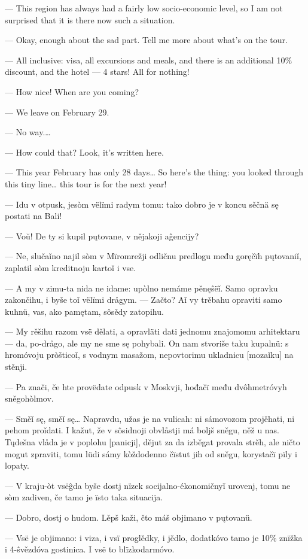 — This region has always had a fairly low socio-economic level, so I am not surprised that it is there now such a situation.

— Okay, enough about the sad part. Tell me more about what’s on the tour.

— All inclusive: visa, all excursions and meals, and there is an additional 10\% discount, and the hotel — 4 stars! All for nothing!

— How nice! When are you coming?

— We leave on February 29.

— No way.…

— How could that? Look, it’s written here.

— This year February has only 28 days… So here’s the thing: you looked through this tiny line… this tour is for the next year!


— Idu v otpusk, jesòm vëlïmi radym tomu: tako dobro je v koncu sěčnä sę postati na Bali!

— Voŭ! De ty si kupil pųtovane, v nějakoji aĝencijy?

— Ne, slučaǐno najil sòm v Mïromrežji odličnu predlogu među goręčïh pųtovaniǐ, zaplatil sòm kreditnoju kartoǐ i vse.

— A my v zimu-ta nida ne idame: upòlno nemáme pěnęŝëǐ. Samo opravku zakončihu, i byše toǐ vëlïmi drågym.
— Začto? Aǐ vy trěbahu opraviti samo kuhnü, vas, ako pamętam, sôsědy zatopihu.

— My rěšihu razom vsë dělati, a opravläti dati jednomu znajomomu arhitektaru — da, po-drågo, ale my ne sme sę pohybali. On nam stvoriše taku kupalnü: s hromóvoju pròšticoǐ, s vodnym masažom, nepovtorimu ukladnicu [mozaǐku] na stěnji.

— Pa znači, če hte provëdate odpusk v Moskvji, hođačï među dvôhmetróvyh sněgohòlmov.

— Směǐ sę, směǐ sę… Napravdu, užas je na vulicah: ni sámovozom projěhati, ni pehom proǐdati. I kažut, že v sôsidnoji obvlåstji má boljš sněgu, něž u nas. Tųdešna vlåda je v poplohu [panicji], dějut za da izběgat provala strěh, ale ničto mogut zpraviti, tomu lüdi sámy kòždodenno čïstut jih od sněgu, korystačï pïly i lopaty.

— V kraju-òt vsëĝda byše dostj nïzek socijalno-ékonomičnyǐ urovenj, tomu ne sòm zadiven, če tamo je ïsto taka situacija.

— Dobro, dostj o hudom. Lěpš kaži, čto máš objimano v pųtovanü.

— Vsë je objimano: i viza, i vsï proglědky, i jědlo, dodatkóvo tamo je 10\% znïžka i 4-ŝvězdóva gostinica. I vsë to blïzkodarmóvo.

